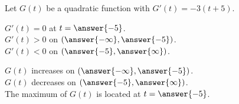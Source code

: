 \documentclass{ximera}
\author{Lee Wayand}
\begin{document}
\begin{exercise} 









Let $G(t)$ be a quadratic function with $G'(t) = -3(t+5)$. \\






\begin{question}



$G'(t) = 0$  at  $t = \answer{-5}$. \\


$G'(t) > 0$ on $\left( \answer{-\infty}, \answer{-5} \right)$. \\


$G'(t) < 0$ on $\left( \answer{-5}, \answer{\infty} \right)$. \\

\end{question}





\begin{question}



$G(t)$ increases on $\left( \answer{-\infty}, \answer{-5} \right)$. \\


$G(t)$ decreases on $\left( \answer{-5}, \answer{\infty} \right)$. \\


The maximum of $G(t)$ is located at  $t = \answer{-5}$. \\

\end{question}
















\end{exercise}
\end{document}
